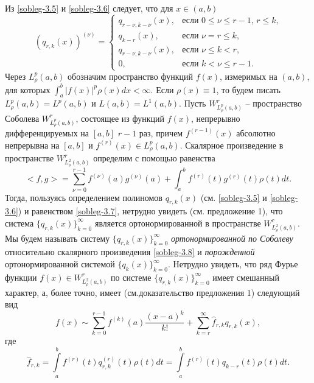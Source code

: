  Из \eqref{sobleg-3.5} и \eqref{sobleg-3.6} следует, что для $x\in (a,b)$
 \begin{equation}\label{sobleg-3.7}
(q_{r,k}(x))^{(\nu)} =\begin{cases}q_{r-\nu,k-\nu}(x),&\text{если $0\le\nu\le r-1$, $r\le k$,}\\
q_{k-r}(x),&\text{если  $\nu=r\le k$,}\\
q_{r-\nu,k-\nu}(x),&\text{если $\nu\le k< r$,}\\
0,&\text{если $k< \nu\le r-1$}.
  \end{cases}
\end{equation}
Через $L^p_\rho(a,b)$ обозначим пространство  функций $f(x)$, измеримых  на  $(a,b)$, для которых $\int_a^b|f(x)|^p\rho(x)dx<\infty$.
Если $\rho(x)\equiv1$, то будем писать $L^p_\rho(a,b)=L^p(a,b)$ и $L(a,b)=L^1(a,b)$.
Пусть $W^r_{L^p_\rho(a,b)}$ -- пространство Соболева $W^r_{L^p_\rho(a,b)}$, состоящее из функций $f(x)$, непрерывно дифференцируемых на $[a,b]$ $r-1$ раз, причем $f^{(r-1)}(x)$ абсолютно непрерывна на $[a,b]$  и $f^{(r)}(x)\in L^p_\rho(a,b)$.
Скалярное произведение в пространстве $W^r_{L^2_\rho(a,b)}$ определим с помощью равенства
\begin{equation}\label{sobleg-3.8}
<f,g>=\sum_{\nu=0}^{r-1}f^{(\nu)}(a)g^{(\nu)}(a)+\int_{a}^{b} f^{(r)}(t)g^{(r)}(t)\rho(t) dt.
\end{equation}
Тогда, пользуясь определением полиномов $q_{r,k}(x)$ (см. \eqref{sobleg-3.5} и \eqref{sobleg-3.6}) и равенством  \eqref{sobleg-3.7}, нетрудно увидеть (см. предложение 1),  что система $\{q_{r,k}(x)\}_{k=0}^\infty$ является ортонормированной в пространстве $W^r_{L^2_\rho(a,b)}$.  Мы будем называть систему $\{q_{r,k}(x)\}_{k=0}^\infty$ \textit{ ортонормированной по Соболеву } относительно скалярного произведения \eqref{sobleg-3.8} и  \textit{ порожденной} ортонормированной системой $\{q_{k}(x)\}_{k=0}^\infty$.
Нетрудно увидеть,  что ряд Фурье функции $f(x)\in W^r_{L^2_\rho(a,b)}$ по системе  $\{q_{r,k}(x)\}_{k=0}^\infty$ имеет смешанный характер, а, более точно, имеет (см.доказательство предложения 1) следующий вид
  \begin{equation}\label{sobleg-3.9}
f(x)\sim \sum_{k=0}^{r-1} f^{(k)}(a)\frac{(x-a)^k}{k!}+ \sum_{k=r}^\infty \hat f_{r,k}q_{r,k}(x),
\end{equation}
где
  \begin{equation}\label{sobleg-3.10}
 \hat f_{r,k}=\int\limits_a^b f^{(r)}(t) q^{(r)}_{r,k}(t)\rho(t)dt=\int\limits_a^b f^{(r)}(t) q_{k-r}(t)\rho(t)dt.
\end{equation}
